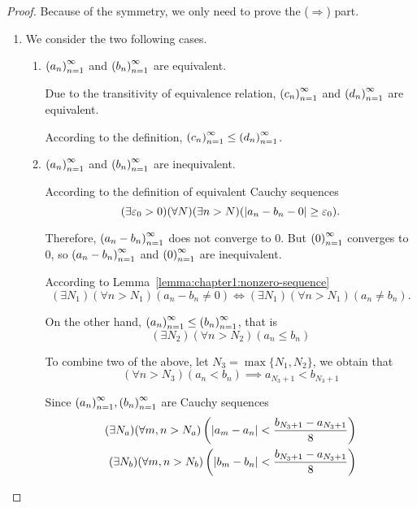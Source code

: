 \begin{proof}
    Because of the symmetry, we only need to prove the ($\Rightarrow$) part.

    \begin{enumerate}[label={(\roman*)}]
        \item We consider the two following cases.

              \begin{enumerate}[label={\textbf{Case \arabic*.}}]
                  \item ${\left({a_{n}}\right)}^{\infty}_{n=1}$ and ${\left({b_{n}}\right)}^{\infty}_{n=1}$ are equivalent.

                        Due to the transitivity of equivalence relation, ${\left({c_{n}}\right)}^{\infty}_{n=1}$ and ${\left({d_{n}}\right)}^{\infty}_{n=1}$ are equivalent.

                        According to the definition, ${\left({c_{n}}\right)}^{\infty}_{n=1}\le{\left({d_{n}}\right)}^{\infty}_{n=1}$.
                  \item ${\left({a_{n}}\right)}^{\infty}_{n=1}$ and ${\left({b_{n}}\right)}^{\infty}_{n=1}$ are inequivalent.

                        According to the definition of equivalent Cauchy sequences
                        \[
                            (\exists\varepsilon_{0} > 0)(\forall N)(\exists n > N)(\left\vert{a_{n} - b_{n} - 0}\right\vert\ge\varepsilon_{0}).
                        \]

                        Therefore, ${\left({a_{n} - b_{n}}\right)}^{\infty}_{n=1}$ does not converge to $0$. But ${\left({0}\right)}^{\infty}_{n=1}$ converges to $0$, so ${\left({a_{n} - b_{n}}\right)}^{\infty}_{n=1}$ and ${\left({0}\right)}^{\infty}_{n=1}$ are inequivalent.

                        According to Lemma~\ref{lemma:chapter1:nonzero-sequence}
                        \[
                            (\exists N_{1})(\forall n > N_{1})(a_{n} - b_{n}\ne 0) \Longleftrightarrow
                            (\exists N_{1})(\forall n > N_{1})(a_{n}\ne b_{n}).
                        \]

                        On the other hand, ${\left({a_{n}}\right)}^{\infty}_{n=1}\le{\left({b_{n}}\right)}^{\infty}_{n=1}$, that is
                        \[
                            (\exists N_{2})(\forall n > N_{2})(a_{n}\le b_{n})
                        \]

                        To combine two of the above, let $N_{3} = \max\{ N_{1}, N_{2} \}$, we obtain that
                        \[
                            (\forall n > N_{3})(a_{n} < b_{n}) \implies a_{N_{3} + 1} < b_{N_{3} + 1}
                        \]

                        Since ${\left({a_{n}}\right)}^{\infty}_{n=1}, {\left({b_{n}}\right)}^{\infty}_{n=1}$ are Cauchy sequences
                        \[
                            \begin{split}
                                (\exists N_{a})(\forall m, n > N_{a})\left(\left\vert{a_{m} - a_{n}}\right\vert < \frac{b_{N_{3}+1} - a_{N_{3}+1}}{8}\right) \\
                                (\exists N_{b})(\forall m, n > N_{b})\left(\left\vert{b_{m} - b_{n}}\right\vert < \frac{b_{N_{3}+1} - a_{N_{3}+1}}{8}\right)
                            \end{split}
                        \]


\end{enumerate}
\end{enumerate}
\end{proof}
